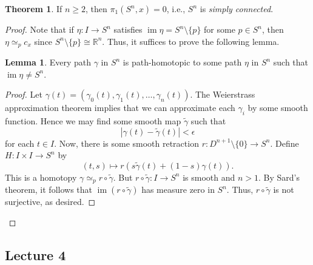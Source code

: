 \documentclass[10pt,letterpaper,cm]{nupset}
\theoremstyle{definition}
\theoremstyle{theorem}
\newtheorem{theorem}[definition]{Theorem}
\newtheorem{lemma}[definition]{Lemma}
\theoremstyle{remark}
\newcommand{\R}{\mathbb{R}}
\newcommand{\1}{\mathbb{1}}
\newcommand{\0}{\vec 0}
\DeclareMathOperator{\im}{im}
\begin{document}
\begin{theorem}
If $n\geq 2$, then $\pi_1(S^n, x) =0$, i.e., $S^n$ is \textit{simply connected}.
\end{theorem}
\begin{proof}
Note that if $\eta : I \to S^n$ satisfies $\im{\eta} = S^n \setminus \{p\}$ for some $p\in S^n$, then $\eta \simeq_p c_x$ since $S^n \setminus \{p\} \cong \R^n$. Thus, it suffices to prove the following lemma.
\begin{lemma}
Every path $\gamma$ in $S^n$ is path-homotopic to some path $\eta$ in $S^n$ such that $\im{\eta} \ne S^n$.
\end{lemma}
\begin{proof}
Let $\gamma(t) = \left(\gamma_0(t), \gamma_1(t), \ldots, \gamma_n(t)\right)$. The Weierstrass approximation theorem implies that we can approximate each $\gamma_i$ by some smooth function. Hence we may find some smooth map $\tilde{\gamma}$ such that $$\left\lvert{\gamma(t) - \tilde{\gamma}(t)}\right\rvert <\epsilon$$ for each $t\in I$. Now, there is some smooth retraction $r: D^{n+1}\setminus \{0\} \to S^n$. Define $H : I \times I \to S^n$ by $$(t, s) \mapsto r(s\tilde{\gamma}(t) + (1-s)\gamma(t)).$$ This is a homotopy $\gamma \simeq_p r\circ \tilde{\gamma}$. But $r\circ \tilde{\gamma} : I \to S^n$ is smooth and $n>1$. By Sard's theorem, it follows that $\im(r\circ \tilde{\gamma})$ has measure zero in $S^n$. Thus, $r\circ \tilde{\gamma}$ is not surjective, as desired. 
\end{proof}
\end{proof}

\subsection{Lecture 4}
\end{document}
